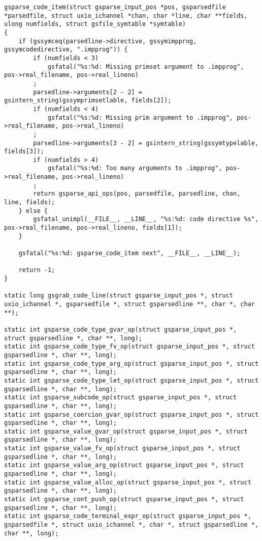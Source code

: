 \documentclass{report}
\begin{document}
\begin{verbatim}
gsparse_code_item(struct gsparse_input_pos *pos, gsparsedfile *parsedfile, struct uxio_ichannel *chan, char *line, char **fields, ulong numfields, struct gsfile_symtable *symtable)
{
    if (gssymceq(parsedline->directive, gssymimpprog, gssymcodedirective, ".impprog")) {
        if (numfields < 3)
            gsfatal("%s:%d: Missing primset argument to .impprog", pos->real_filename, pos->real_lineno)
        ;
        parsedline->arguments[2 - 2] = gsintern_string(gssymprimsetlable, fields[2]);
        if (numfields < 4)
            gsfatal("%s:%d: Missing prim argument to .impprog", pos->real_filename, pos->real_lineno)
        ;
        parsedline->arguments[3 - 2] = gsintern_string(gssymtypelable, fields[3]);
        if (numfields > 4)
            gsfatal("%s:%d: Too many arguments to .impprog", pos->real_filename, pos->real_lineno)
        ;
        return gsparse_api_ops(pos, parsedfile, parsedline, chan, line, fields);
    } else {
        gsfatal_unimpl(__FILE__, __LINE__, "%s:%d: code directive %s", pos->real_filename, pos->real_lineno, fields[1]);
    }

    gsfatal("%s:%d: gsparse_code_item next", __FILE__, __LINE__);

    return -1;
}

static long gsgrab_code_line(struct gsparse_input_pos *, struct uxio_ichannel *, gsparsedfile *, struct gsparsedline **, char *, char **);

static int gsparse_code_type_gvar_op(struct gsparse_input_pos *, struct gsparsedline *, char **, long);
static int gsparse_code_type_fv_op(struct gsparse_input_pos *, struct gsparsedline *, char **, long);
static int gsparse_code_type_arg_op(struct gsparse_input_pos *, struct gsparsedline *, char **, long);
static int gsparse_code_type_let_op(struct gsparse_input_pos *, struct gsparsedline *, char **, long);
static int gsparse_subcode_op(struct gsparse_input_pos *, struct gsparsedline *, char **, long);
static int gsparse_coercion_gvar_op(struct gsparse_input_pos *, struct gsparsedline *, char **, long);
static int gsparse_value_gvar_op(struct gsparse_input_pos *, struct gsparsedline *, char **, long);
static int gsparse_value_fv_op(struct gsparse_input_pos *, struct gsparsedline *, char **, long);
static int gsparse_value_arg_op(struct gsparse_input_pos *, struct gsparsedline *, char **, long);
static int gsparse_value_alloc_op(struct gsparse_input_pos *, struct gsparsedline *, char **, long);
static int gsparse_cont_push_op(struct gsparse_input_pos *, struct gsparsedline *, char **, long);
static int gsparse_code_terminal_expr_op(struct gsparse_input_pos *, gsparsedfile *, struct uxio_ichannel *, char *, struct gsparsedline *, char **, long);


\end{verbatim}
\end{document}
